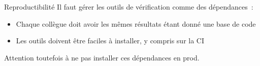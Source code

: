 \begin{frame}{Reproductibilité}
  Il faut gérer les outils de vérification comme des dépendances~:

  \begin{itemize}
    \item Chaque collègue doit avoir les mêmes résultats étant donné une base de code
    \item Les outils doivent être faciles à installer, y compris sur la CI
  \end{itemize}

  Attention toutefois à ne pas installer ces dépendances en prod.
\end{frame}
